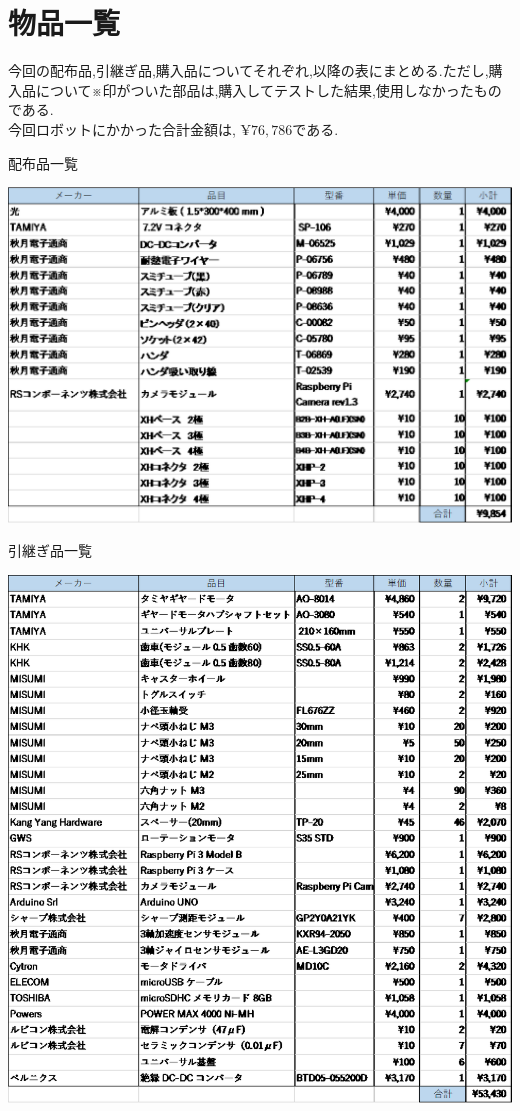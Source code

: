 \documentclass[10pt,a4j]{ujarticle}
\begin{document}
\section{物品一覧}
今回の配布品,引継ぎ品,購入品についてそれぞれ,以降の表にまとめる.ただし,購入品について※印がついた部品は,購入してテストした結果,使用しなかったものである.\\

今回ロボットにかかった合計金額は, $\yen 76,786$である.

\begin{table}[h]
	\centering
	\caption{配布品一覧}
	\includegraphics[clip,scale=0.4]{haihu.eps}
    \label{haihu}
\end{table}

\begin{table}[h]
	\centering
	\caption{引継ぎ品一覧}
	\includegraphics[clip,scale=0.4]{hikitsugi.eps}
 \label{hikitsugi}
\end{table}
\end{document}
